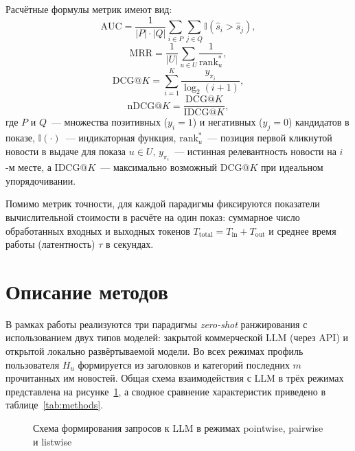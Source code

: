 \documentclass{misisarticle}
\begin{document}
Расчётные формулы метрик имеют вид:
\begin{equation}
  \mathrm{AUC} = \frac{1}{|P| \cdot |Q|} \sum_{i \in P} \sum_{j \in Q} \mathbb{I}(\hat{s}_i > \hat{s}_j),
  \label{eq:auc}
\end{equation}
\begin{equation}
  \mathrm{MRR} = \frac{1}{|U|} \sum_{u \in U} \frac{1}{\mathrm{rank}_u^*},
  \label{eq:mrr}
\end{equation}
\begin{equation}
  \mathrm{DCG}@K = \sum_{i=1}^{K} \frac{y_{\pi_i}}{\log_2(i + 1)},
  \label{eq:dcg}
\end{equation}
\begin{equation}
  \mathrm{nDCG}@K = \frac{\mathrm{DCG}@K}{\mathrm{IDCG}@K},
  \label{eq:ndcg}
\end{equation}
где $P$ и $Q$~--- множества позитивных ($y_i = 1$) и негативных ($y_j = 0$) кандидатов в показе, $\mathbb{I}(\cdot)$~--- индикаторная функция, $\mathrm{rank}_u^*$~--- позиция первой кликнутой новости в выдаче для показа $u \in U$, $y_{\pi_i}$~--- истинная релевантность новости на $i$-м месте, а $\mathrm{IDCG}@K$~--- максимально возможный $\mathrm{DCG}@K$ при идеальном упорядочивании.

Помимо метрик точности, для каждой парадигмы фиксируются показатели вычислительной стоимости в расчёте на один показ: суммарное число обработанных входных и выходных токенов $T_{\mathrm{total}} = T_{\mathrm{in}} + T_{\mathrm{out}}$ и среднее время работы (латентность) $\tau$ в секундах.

\section{Описание методов}

В рамках работы реализуются три парадигмы \textit{zero-shot} ранжирования с использованием двух типов моделей: закрытой коммерческой LLM (через API) и открытой локально развёртываемой модели. Во всех режимах профиль пользователя $H_u$ формируется из заголовков и категорий последних $m$ прочитанных им новостей. Общая схема взаимодействия с LLM в трёх режимах представлена на рисунке~\ref{fig:schemes}, а сводное сравнение характеристик приведено в таблице~\ref{tab:methods}.

\begin{figure}[htbp]
  \centering
  \caption{Схема формирования запросов к LLM в режимах pointwise, pairwise и listwise}
  \label{fig:schemes}
\end{figure}
\end{document}
